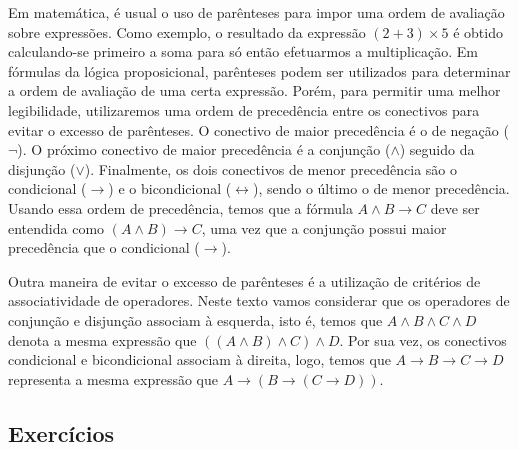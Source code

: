 Em matem\'atica, \'e usual o uso de par\^enteses para impor uma ordem
de avalia\c{c}\~ao sobre express\~oes. Como exemplo, o resultado da express\~ao $(2
+ 3)\times 5$ \'e obtido calculando-se primeiro a soma para s\'o
ent\~ao efetuarmos a multiplica\c{c}\~ao. Em f\'ormulas da l\'ogica
proposicional, par\^enteses podem ser utilizados para determinar a
ordem de avalia\c{c}\~ao de uma certa express\~ao.
Por\'em, para permitir uma melhor legibilidade, utilizaremos uma ordem de preced\^encia entre
os conectivos para evitar o excesso de par\^enteses. O conectivo de
maior preced\^encia \'e o de nega\c{c}\~ao ($\neg$). O pr\'oximo
conectivo de maior preced\^encia \'e a conjun\c{c}\~ao ($\land$)
seguido da disjun\c{c}\~ao ($\lor$). Finalmente, os dois conectivos de menor
preced\^encia s\~ao o condicional ($\to$) e o bicondicional
($\leftrightarrow$), sendo o \'ultimo o de menor preced\^encia.
Usando essa ordem de preced\^encia, temos que a f\'ormula $A \land  B
\to C$ deve ser entendida como $(A \land B) \to C$, uma vez que a
conjun\c{c}\~ao possui maior preced\^encia que o condicional ($\to$).

Outra maneira de evitar o excesso de par\^enteses \'e a
utiliza\c{c}\~ao de crit\'erios de associatividade de
operadores. Neste texto vamos considerar que os operadores de
conjun\c{c}\~ao e disjun\c{c}\~ao associam \`a esquerda, isto \'e,
temos que $A \land B \land C \land D$ denota a mesma express\~ao que
$((A \land B) \land C) \land D$. Por sua vez, os conectivos
condicional e bicondicional associam \`a direita, logo, temos que
$A \to B \to C \to D$ representa a mesma express\~ao  que
$A \to (B \to (C \to D))$.


\subsection{Exerc\'icios}

